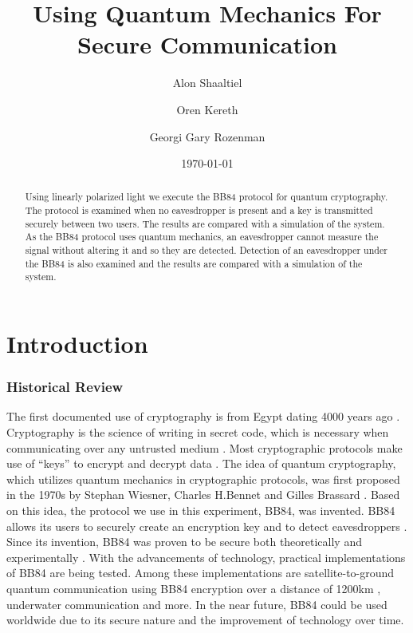 \documentclass[reprint,amsmath,amssymb,aps, prl,superscriptaddress]{revtex4-2}
\begin{document}
\title{Using Quantum Mechanics For Secure Communication}
\author{Alon Shaaltiel}
\author{Oren Kereth}
\author{Georgi Gary Rozenman}
\date{\today}
\begin{abstract}
Using linearly polarized light we execute the BB84 protocol
for quantum cryptography. The protocol is examined when no eavesdropper
is present and a key is transmitted securely between two users. The
results are compared with a simulation of the system. As the BB84
protocol uses quantum mechanics, an eavesdropper cannot measure the
signal without altering it and so they are detected. Detection of
an eavesdropper under the BB84 is also examined and the results are
compared with a simulation of the system.
\end{abstract}
\maketitle
\newcommand{\de}{^{\circ}}
\newcommand\Ket[1]{\ket{#1}}%
\renewcommand*{\thesection}{\arabic{section}}
\renewcommand*{\thesubsection}{\arabic{section}.\arabic{subsection}}
\part*{Introduction}

\section*{Historical Review}

The first documented use of cryptography is from Egypt dating 4000 years ago \cite{FirstdocumenteduseofCrypto}. Cryptography is the science of writing in secret code, which is necessary when communicating over any untrusted medium \cite{Cryptodorigins}. Most cryptographic protocols make use of ``keys'' to encrypt and decrypt data \cite{CryptoKeys}. The idea of quantum cryptography, which utilizes quantum mechanics in cryptographic protocols, was first proposed in the 1970s by Stephan Wiesner, Charles H.Bennet and Gilles Brassard \cite{QuantumCryptoOrigin}. Based on this idea, the protocol we use  in this experiment, BB84, was invented. BB84 allows its users to securely create an encryption key and to detect eavesdroppers \cite{ORIGINALBB84}. Since its invention, BB84 was proven to be secure both theoretically and experimentally \cite{BB84SECURETheory,BB84SECUREExperiment}. With the advancements of technology, practical implementations of BB84 are being tested. Among these implementations are satellite-to-ground quantum communication using BB84 encryption over a distance of 1200km \cite{BB84Satellite}, underwater communication\cite{BB84underwater1,BB84underwater2} and more. In the near future, BB84 could be used worldwide due to its secure nature and the improvement of technology over time. 
\end{document}
